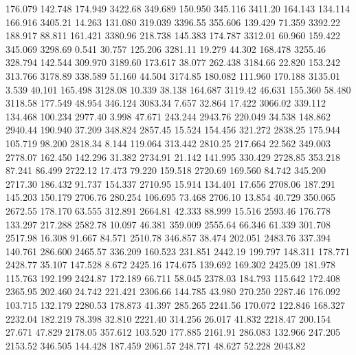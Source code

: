  176.079  142.748  174.949      3422.68
 349.689  150.950  345.116      3411.20
 164.143  134.114  166.916      3405.21
  14.263  131.080  319.039      3396.55
 355.606  139.429   71.359      3392.22
 188.917   88.811  161.421      3380.96
 218.738  145.383  174.787      3312.01
  60.960  159.422  345.069      3298.69
   0.541   30.757  125.206      3281.11
  19.279   44.302  168.478      3255.46
 328.794  142.544  309.970      3189.60
 173.617   38.077  262.438      3184.66
  22.820  153.242  313.766      3178.89
 338.589   51.160   44.504      3174.85
 180.082  111.960  170.188      3135.01
   3.539   40.101  165.498      3128.08
  10.339   38.138  164.687      3119.42
  46.631  155.360   58.480      3118.58
 177.549   48.954  346.124      3083.34
   7.657   32.864   17.422      3066.02
 339.112  134.468  100.234      2977.40
   3.998   47.671  243.244      2943.76
 220.049   34.538  148.862      2940.44
 190.940   37.209  348.824      2857.45
  15.524  154.456  321.272      2838.25
 175.944  105.719   98.200      2818.34
   8.144  119.064  313.442      2810.25
 217.664   22.562  349.003      2778.07
 162.450  142.296   31.382      2734.91
  21.142  141.995  330.429      2728.85
 353.218   87.241   86.499      2722.12
  17.473   79.220  159.518      2720.69
 169.560   84.742  345.200      2717.30
 186.432   91.737  154.337      2710.95
  15.914  134.401   17.656      2708.06
 187.291  145.203  150.179      2706.76
 280.254  106.695   73.468      2706.10
  13.854   40.729  350.065      2672.55
 178.170   63.555  312.891      2664.81
  42.333   88.999   15.516      2593.46
 176.778  133.297  217.288      2582.78
  10.097   46.381  359.009      2555.64
  66.346   61.339  301.708      2517.98
  16.308   91.667   84.571      2510.78
 346.857   38.474  202.051      2483.76
 337.394  140.761  286.600      2465.57
 336.209  160.523  231.851      2442.19
 199.797  148.311  178.771      2428.77
  35.107  147.528    8.672      2425.16
 174.675  139.692  169.302      2425.09
 181.978  115.763  192.199      2424.87
 172.189   66.711   58.045      2378.03
 184.793  115.642  172.408      2365.95
 202.460   24.742  221.421      2306.66
 144.785   43.980  270.250      2287.46
 176.092  103.715  132.179      2280.53
 178.873   41.397  285.265      2241.56
 170.072  122.846  168.327      2232.04
 182.219   78.398   32.810      2221.40
 314.256   26.017   41.832      2218.47
 200.154   27.671   47.829      2178.05
 357.612  103.520  177.885      2161.91
 286.083  132.966  247.205      2153.52
 346.505  144.428  187.459      2061.57
 248.771   48.627   52.228      2043.82
